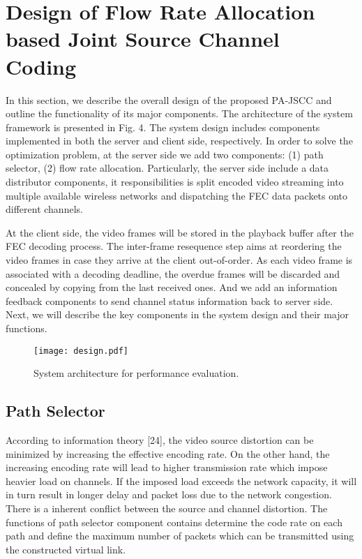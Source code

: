 \documentclass[journal]{IEEEtran}
\begin{document}
\section{Design of Flow Rate Allocation based Joint Source Channel Coding}
In this section, we describe the overall design of the proposed PA-JSCC and outline the functionality of its major components. The architecture of the system framework is presented in Fig. 4. The system design includes components implemented in both the server and client side, respectively. In order to solve the optimization problem, at the server side we add two components: (1) path selector, (2) flow rate allocation. Particularly, the server side include a data distributor components, it responsibilities is split encoded video streaming into multiple available wireless networks and dispatching the FEC data packets onto different channels.

At the client side, the video frames will be stored in the playback buffer after the FEC decoding process. The inter-frame resequence step aims at reordering the video frames in case they arrive at the client out-of-order. As each video frame is associated with a decoding deadline, the overdue frames will be discarded and concealed by copying from the last received ones. And we add an information feedback components to send channel status information back to server side. Next, we will describe the key components in the system design and their major functions.

\begin{figure}[htbp]
\vspace{-5pt}
\centering
 \texttt{[image: design.pdf]}
 \caption{System architecture for performance evaluation.}\label{7}
 \vspace{-10pt}
\end{figure}

\subsection{Path Selector}
According to information theory [24], the video source distortion can be minimized by increasing the effective encoding rate. On the other hand, the increasing encoding rate will lead to higher transmission rate which impose heavier load on channels. If the imposed load exceeds the network capacity, it will in turn result in longer delay and packet loss due to the network congestion. There is a inherent conflict between the source and channel distortion. The functions of path selector component contains determine the code rate on each path and define the maximum number of packets which can be transmitted using the constructed virtual link.
\end{document}

